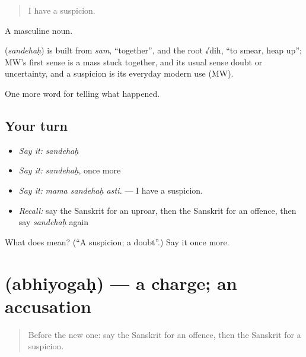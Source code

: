 \begin{quote}
I have a suspicion.
\end{quote}

A masculine noun.

\begin{cousinweb}
\textbf{} (\emph{sandehaḥ}) is built from \emph{sam}, \textquotedblleft{}together\textquotedblright{}, and the root √dih, \textquotedblleft{}to smear, heap up\textquotedblright{}; MW's first sense is a mass stuck together, and its usual sense doubt or uncertainty, and a suspicion is its everyday modern use (MW).
\end{cousinweb}

\begin{grammarlens}[title={What you've built}]
One more word for telling what happened.
\end{grammarlens}

\subsection*{Your turn}
\begin{itemize}
\raggedright
  \item \emph{Say it:} \emph{sandehaḥ}
  \item \emph{Say it:} \emph{sandehaḥ}, once more
  \item \emph{Say it:} \emph{mama sandehaḥ asti.} — I have a suspicion.
  \item \emph{Recall:} say the Sanskrit for an uproar, then the Sanskrit for an offence, then say \emph{sandehaḥ} again
\end{itemize}

\begin{tcolorbox}[breakable,colback=teal!4,colframe=teal!35!black,title={Before you move on}]
What does  mean? (\textquotedblleft{}A suspicion; a doubt\textquotedblright{}.) Say it once more.
\end{tcolorbox}
\section[\texorpdfstring{\sk{अभियोगः} (abhiyogaḥ)}{अभियोगः (abhiyogaḥ)}]{ (abhiyogaḥ) — a charge; an accusation}

\label{lesson:SA-C288-abhiyogah}



\begin{quote}
Before the new one: say the Sanskrit for an offence, then the Sanskrit for a suspicion.
\end{quote}

